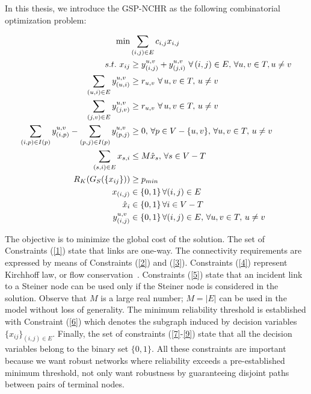 In this thesis, we introduce the GSP-NCHR as the following combinatorial optimization problem:

\begin{align}
\min &\sum_{(i,j)\in E} c_{i,j}x_{i,j} \notag \\
s.t. \, \, x_{ij}&\geq y_{(i,j)}^{u,v}+y_{(j,i)}^{u,v} \, \, \forall \, (i,j)\in E, \, \forall u,v\in T, u\neq v \label{1}\\
\sum_{(u,i)\in E}y_{(u,i)}^{u,v} &\geq r_{u,v} \, \, \forall \, u,v\in T, \, u\neq v \label{2}\\
\sum_{(j,v)\in E}y_{(j,v)}^{u,v} &\geq r_{u,v} \, \, \forall \, u,v\in T, \, u\neq v \label{3}\\
\sum_{(i,p)\in I(p)}y_{(i,p)}^{u,v}  - \sum_{(p,j)\in I(p)}y_{(p,j)}^{u,v}&\geq 0, \, \forall p\in V-\{u,v\}, \, \forall u,v\in T, \, u\neq v \label{4}\\
\sum_{(s,i)\in E} x_{s,i} &\leq M \hat{x}_{s}, \, \forall s\in V-T \label{5}\\
R_{K}(G_S(\{x_{ij}\})) &\geq p_{min} \label{6}\\
x_{(i,j)} &\in \{0,1\} \, \forall (i,j)\in E \label{7}\\
\hat{x}_{i} &\in \{0,1\} \, \forall i \in V-T  \label{8}\\
 y_{(i,j)}^{u,v} &\in \{0,1\} \, \forall (i,j)\in E, \, \forall u,v \in T, \, u\neq v \label{9}
\end{align}


The objective is to minimize the global cost of the solution. The set of Constraints (\ref{1}) state that links are one-way. 
The connectivity requirements are expressed by means of Constraints (\ref{2}) and (\ref{3}). 
Constraints (\ref{4}) represent Kirchhoff law, or flow conservation~\cite{23}. Constraints (\ref{5}) state that an incident link 
to a Steiner node can be used only if the Steiner node is considered in the solution. Observe that $M$ is a large real number; $M=|E|$ can be used in the model without loss of generality. The minimum reliability threshold is established with Constraint (\ref{6}) which denotes the subgraph induced by decision variables $\{x_{ij}\}_{(i,j)\in E}$. Finally, the set of constraints (\ref{7}-\ref{9}) state that all the decision variables belong to the binary set $\{0,1\}$. All these constraints are important because we want robust networks where reliability exceeds a pre-established minimum threshold, not only want robustness by guaranteeing disjoint paths between pairs of terminal nodes.

